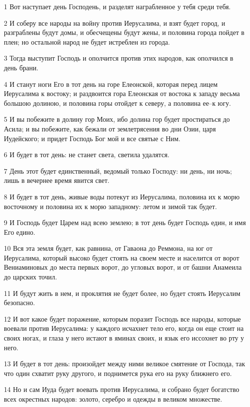 \par 1 Вот наступает день Господень, и разделят награбленное у тебя среди тебя.
\par 2 И соберу все народы на войну против Иерусалима, и взят будет город, и разграблены будут домы, и обесчещены будут жены, и половина города пойдет в плен; но остальной народ не будет истреблен из города.
\par 3 Тогда выступит Господь и ополчится против этих народов, как ополчился в день брани.
\par 4 И станут ноги Его в тот день на горе Елеонской, которая перед лицем Иерусалима к востоку; и раздвоится гора Елеонская от востока к западу весьма большою долиною, и половина горы отойдет к северу, а половина ее--к югу.
\par 5 И вы побежите в долину гор Моих, ибо долина гор будет простираться до Асила; и вы побежите, как бежали от землетрясения во дни Озии, царя Иудейского; и придет Господь Бог мой и все святые с Ним.
\par 6 И будет в тот день: не станет света, светила удалятся.
\par 7 День этот будет единственный, ведомый только Господу: ни день, ни ночь; лишь в вечернее время явится свет.
\par 8 И будет в тот день, живые воды потекут из Иерусалима, половина их к морю восточному и половина их к морю западному: летом и зимой так будет.
\par 9 И Господь будет Царем над всею землею; в тот день будет Господь един, и имя Его едино.
\par 10 Вся эта земля будет, как равнина, от Гаваона до Реммона, на юг от Иерусалима, который высоко будет стоять на своем месте и населится от ворот Вениаминовых до места первых ворот, до угловых ворот, и от башни Анамеила до царских точил.
\par 11 И будут жить в нем, и проклятия не будет более, но будет стоять Иерусалим безопасно.
\par 12 И вот какое будет поражение, которым поразит Господь все народы, которые воевали против Иерусалима: у каждого исчахнет тело его, когда он еще стоит на своих ногах, и глаза у него истают в яминах своих, и язык его иссохнет во рту у него.
\par 13 И будет в тот день: произойдет между ними великое смятение от Господа, так что один схватит руку другого, и поднимется рука его на руку ближнего его.
\par 14 Но и сам Иуда будет воевать против Иерусалима, и собрано будет богатство всех окрестных народов: золото, серебро и одежды в великом множестве.
